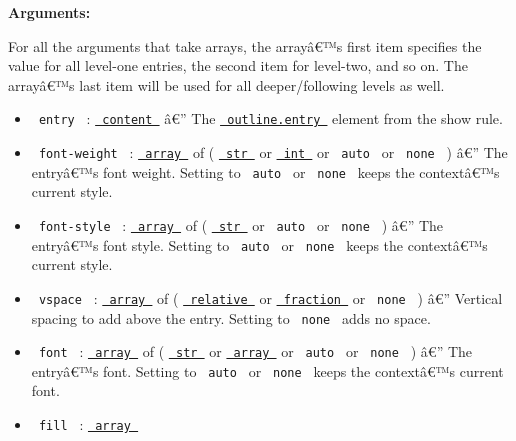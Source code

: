 \textbf{Arguments:}

For all the arguments that take arrays, the arrayâ€™s first item
specifies the value for all level-one entries, the second item for
level-two, and so on. The arrayâ€™s last item will be used for all
deeper/following levels as well.

\begin{itemize}
\tightlist
\item
  \texttt{\ entry\ } :
  \href{https://typst.app/docs/reference/foundations/content/}{\texttt{\ content\ }}
  â€'' The
  \href{https://typst.app/docs/reference/model/outline/\#definitions-entry}{\texttt{\ outline.entry\ }}
  element from the show rule.
\item
  \texttt{\ font-weight\ } :
  \href{https://typst.app/docs/reference/foundations/array/}{\texttt{\ array\ }}
  of (
  \href{https://typst.app/docs/reference/foundations/str/}{\texttt{\ str\ }}
  or
  \href{https://typst.app/docs/reference/foundations/int/}{\texttt{\ int\ }}
  or \texttt{\ auto\ } or \texttt{\ none\ } ) â€'' The entryâ€™s font
  weight. Setting to \texttt{\ auto\ } or \texttt{\ none\ } keeps the
  contextâ€™s current style.
\item
  \texttt{\ font-style\ } :
  \href{https://typst.app/docs/reference/foundations/array/}{\texttt{\ array\ }}
  of (
  \href{https://typst.app/docs/reference/foundations/str/}{\texttt{\ str\ }}
  or \texttt{\ auto\ } or \texttt{\ none\ } ) â€'' The entryâ€™s font
  style. Setting to \texttt{\ auto\ } or \texttt{\ none\ } keeps the
  contextâ€™s current style.
\item
  \texttt{\ vspace\ } :
  \href{https://typst.app/docs/reference/foundations/array/}{\texttt{\ array\ }}
  of (
  \href{https://typst.app/docs/reference/layout/relative/}{\texttt{\ relative\ }}
  or
  \href{https://typst.app/docs/reference/layout/fraction/}{\texttt{\ fraction\ }}
  or \texttt{\ none\ } ) â€'' Vertical spacing to add above the entry.
  Setting to \texttt{\ none\ } adds no space.
\item
  \texttt{\ font\ } :
  \href{https://typst.app/docs/reference/foundations/array/}{\texttt{\ array\ }}
  of (
  \href{https://typst.app/docs/reference/foundations/str/}{\texttt{\ str\ }}
  or
  \href{https://typst.app/docs/reference/foundations/array/}{\texttt{\ array\ }}
  or \texttt{\ auto\ } or \texttt{\ none\ } ) â€'' The entryâ€™s font.
  Setting to \texttt{\ auto\ } or \texttt{\ none\ } keeps the
  contextâ€™s current font.
\item
  \texttt{\ fill\ } :
  \href{https://typst.app/docs/reference/foundations/array/}{\texttt{\ array\ }}

\end{itemize}
